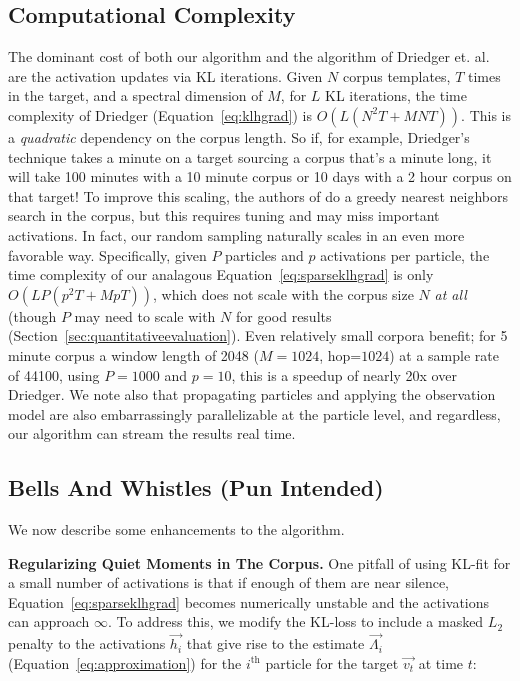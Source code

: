\documentclass{article}
\begin{document}
\subsection{Computational Complexity} 
\label{sec:complexity}
The dominant cost of both our algorithm and the algorithm of Driedger et. al. are the activation updates via KL iterations.  Given $N$ corpus templates, $T$ times in the target, and a spectral dimension of $M$, for $L$ KL iterations, the time complexity of Driedger (Equation~\ref{eq:klhgrad}) is $O(L(N^2T + MNT))$.  This is a {\em quadratic} dependency on the corpus length.  So if, for example, Driedger's technique takes a minute on a target sourcing a corpus that's a minute long, it will take 100 minutes with a 10 minute corpus or 10 days with a 2 hour corpus on that target!  To improve this scaling, the authors of \cite{buch2017nichtnegativematrixfaktorisierungnutzendesklangsynthesensystem} do a greedy nearest neighbors search in the corpus, but this requires tuning and may miss important activations.  In fact, our random sampling naturally scales in an even more favorable way.  Specifically, given $P$ particles and $p$ activations per particle, the time complexity of our analagous Equation~\ref{eq:sparseklhgrad} is only $O(LP(p^2T + MpT))$, which does not scale with the corpus size $N$ {\em at all} (though $P$ may need to scale with $N$ for good results (Section~\ref{sec:quantitativeevaluation}).  Even relatively small corpora benefit; for 5 minute corpus a window length of 2048 ($M=1024$, hop=$1024$) at a sample rate of 44100, using $P=1000$ and $p=10$, this is a speedup of nearly 20x over Driedger.  We note also that propagating particles and applying the observation model are also embarrassingly parallelizable at the particle level, and regardless, our algorithm can stream the results real time.


\subsection{Bells And Whistles (Pun Intended)}

We now describe some enhancements to the algorithm.



\textbf{Regularizing Quiet Moments in The Corpus.} One pitfall of using KL-fit for a small number of activations is that if enough of them are near silence, Equation~\ref{eq:sparseklhgrad} becomes numerically unstable and the activations can approach $\infty$.  To address this, we modify the KL-loss to include a masked $L_2$ penalty to the activations $\vec{h_i}$ that give rise to the estimate $\vec{\Lambda_i}$ (Equation~\ref{eq:approximation}) for the $i^{\text{th}}$ particle for the target $\vec{v_t}$ at time $t$:
\end{document}
